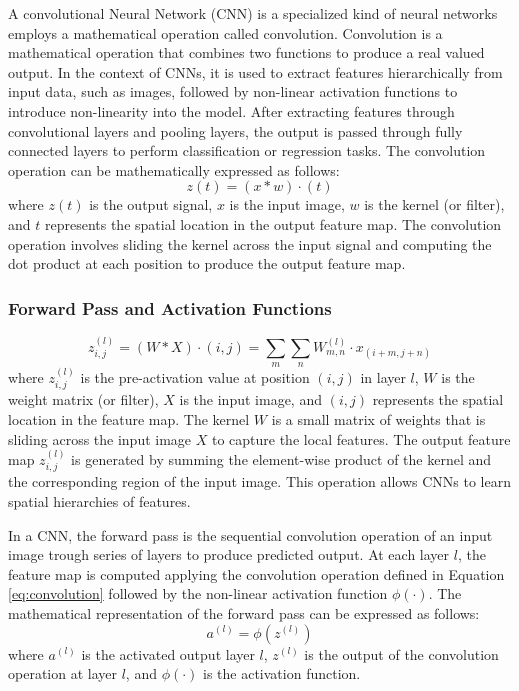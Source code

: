 A convolutional Neural Network (CNN) is a specialized kind of neural networks employs a mathematical operation called convolution.
Convolution is a mathematical operation that combines two functions to produce a real valued output. In the context of CNNs, it is used to extract features hierarchically from input data,
such as images, followed by non-linear activation functions to introduce non-linearity into the model. After extracting features through convolutional layers and pooling layers, the output is passed through fully connected layers to perform classification or regression tasks.
The convolution operation can be mathematically expressed as follows:
\begin{equation}
 z{(t)} = (x*w)\cdot(t)
 \label{eq:convolutionbasic}
\end{equation}
where $z(t)$ is the output signal, $x$ is the input image, $w$ is the kernel (or filter), and $t$ represents the spatial location in the output feature map. The convolution operation involves sliding the kernel across the input signal and computing the dot product at each position to produce the output feature map.
\subsubsection{Forward Pass and Activation Functions}
\begin{equation}
 z^{(l)}_{i,j} = (W*X)\cdot(i,j)=\sum_{m} \sum_{n} W^{(l)}_{m,n} \cdot x_{(i+m, j+n)}
 \label{eq:convolution}
\end{equation}
where $z^{(l)}_{i,j}$ is the pre-activation value at position $(i,j)$ in layer $l$, $W$ is the weight matrix (or filter), $X$ is the input image, and $(i,j)$ represents the spatial location in the feature map.
The kernel $W$ is a small matrix of weights that is sliding across the input image $X$ to capture the local features. The output feature map $z^{(l)}_{i,j}$ is generated by summing the element-wise product of the kernel and the corresponding region of the input image.
This operation allows CNNs to learn spatial hierarchies of features.

In a CNN, the forward pass is the sequential convolution operation of an input image  trough series of layers to produce predicted output.
At each layer $l$, the feature map is computed applying the convolution operation defined in Equation \ref{eq:convolution} followed by the non-linear activation function $\phi(\cdot)$. The mathematical representation of the forward pass can be expressed as follows:
\begin{equation}
    a^{(l)} = \phi(z^{(l)})
    \label{eq:activation}
\end{equation}
where $a^{(l)}$ is the activated output layer $l$, $z^{(l)}$ is the output of the convolution operation at layer $l$,
and $\phi(\cdot)$ is the activation function. 

